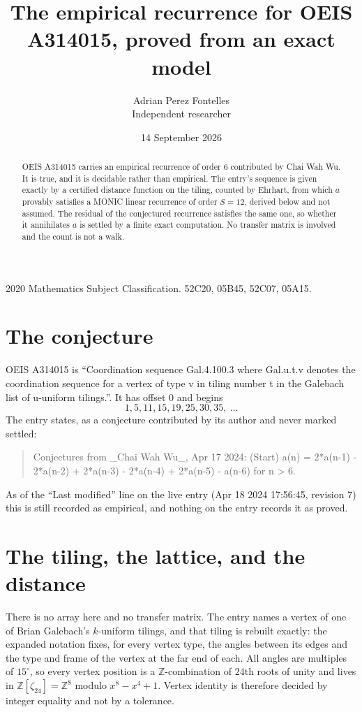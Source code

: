 \documentclass[11pt,a4paper]{article}
\title{The empirical recurrence for OEIS A314015, proved from an exact model}
\author{Adrian Perez Fontelles\\ \small Independent researcher}
\date{14 September 2026}
\theoremstyle{plain}
\theoremstyle{definition}
\begin{document}
\maketitle

\begin{abstract}
OEIS A314015 carries an empirical recurrence of order $6$ contributed by Chai Wah Wu. It is true, and it is
decidable rather than empirical. The entry's sequence is given exactly by a certified distance function on the tiling, counted by Ehrhart, from
which $a$ provably satisfies a MONIC linear recurrence of order $S=12$, derived below and not
assumed. The residual of the conjectured recurrence satisfies the same one, so whether it
annihilates $a$ is settled by a finite exact computation. No transfer matrix is involved and the count is not a walk.
\end{abstract}

\noindent\small 2020 Mathematics Subject Classification. 52C20, 05B45, 52C07, 05A15.\normalsize

\section{The conjecture}

OEIS A314015 is ``Coordination sequence Gal.4.100.3 where Gal.u.t.v denotes the coordination sequence for a vertex of type v in tiling number t in the Galebach list of u-uniform tilings.''. It has offset $0$ and begins
\[
1, 5, 11, 15, 19, 25, 30, 35,\ \dots
\]
The entry states, as a conjecture contributed by its author and never marked settled:
\begin{quote}
Conjectures from \_Chai Wah Wu\_, Apr 17 2024: (Start) a(n) = 2*a(n-1) - 2*a(n-2) + 2*a(n-3) - 2*a(n-4) + 2*a(n-5) - a(n-6) for n > 6.
\end{quote}
As of the ``Last modified'' line on the live entry (Apr 18 2024 17:56:45, revision 7)
this is still recorded as empirical, and nothing on the entry records it as proved.

\section{The tiling, the lattice, and the distance}

There is no array here and no transfer matrix. The entry names a vertex of one of Brian
Galebach's $k$-uniform tilings, and that tiling is rebuilt exactly: the expanded notation
fixes, for every vertex type, the angles between its edges and the type and frame of the
vertex at the far end of each. All angles are multiples of $15^\circ$, so every vertex
position is a $\mathbb{Z}$-combination of $24$th roots of unity and lives in
$\mathbb{Z}[\zeta_{24}]=\mathbb{Z}^{8}$ modulo $x^{8}-x^{4}+1$. Vertex identity is
therefore decided by integer equality and not by a tolerance.
\end{document}
